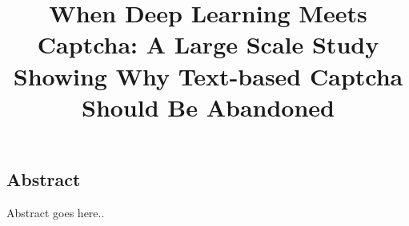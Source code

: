 \documentclass[letterpaper,twocolumn,10pt]{article}
\begin{document}

\title{When Deep Learning Meets Captcha: A Large Scale Study Showing Why Text-based Captcha Should Be Abandoned}
\author{
}


\maketitle

\subsection*{Abstract}
Abstract goes here..








%






%
%


{\footnotesize


}
\end{document}
